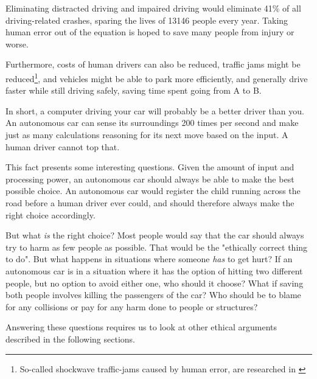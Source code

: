 Eliminating distracted driving and impaired driving would eliminate 41\% of all driving-related crashes, sparing the lives of 13146 people every year. Taking human error out of the equation is hoped to save many people from injury or worse.  

Furthermore, costs of human drivers can also be reduced, traffic jams might be reduced\footnote{So-called shockwave traffic-jams caused by human error, are researched in \cite{1367-2630-10-3-033001}}, and vehicles might be able to park more efficiently, and generally drive faster while still driving safely, saving time spent going from A to B. 

\newpar In short, a computer driving your car will probably be a better driver than you. An autonomous car can sense its surroundings 200 times per second and make just as many calculations reasoning for its next move based on the input. A human driver cannot top that. \cite{audirace}

This fact presents some interesting questions. Given the amount of input and processing power, an autonomous car should always be able to make the best possible choice. An autonomous car would register the child running across the road before a human driver ever could, and should therefore always make the right choice accordingly. 

\newpar But what \textit{is} the right choice? Most people would say that the car should always try to harm as few people as possible. That would be the "ethically correct thing to do". \cite{DBLP:journals/corr/BonnefonSR15} But what happens in situations where someone \textit{has} to get hurt? If an autonomous car is in a situation where it has the option of hitting two different people, but no option to avoid either one, who should it choose? What if saving both people involves killing the passengers of the car? Who should be to blame for any collisions or pay for any harm done to people or structures? 


Answering these questions requires us to look at other ethical arguments described in the following sections.   